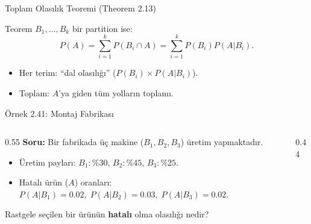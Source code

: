 \documentclass[light]{lutbeamer}
\begin{document}
\begin{frame}[fragile]{Toplam Olasılık Teoremi (Theorem 2.13)}
    \begin{block}{Teorem}
        \(B_1,\dots,B_k\) bir partition ise:
        \[
        P(A)=\sum_{i=1}^{k}P(B_i\cap A)=\sum_{i=1}^{k}P(B_i)P(A|B_i).
        \]
    \end{block}

    \begin{itemize}
        \item Her terim: ``dal olasılığı'' (\(P(B_i)\times P(A|B_i)\)).
        \item Toplam: \(A\)'ya giden tüm yolların toplamı.
    \end{itemize}
\end{frame}


\begin{frame}{Örnek 2.41: Montaj Fabrikası}
    \small
    \begin{columns}[T]
        \begin{column}{0.55\textwidth}
            \textbf{Soru:}
            Bir fabrikada üç makine ($B_1, B_2, B_3$) üretim yapmaktadır.
            \begin{itemize}
                \item Üretim payları: $B_1: \%30, \, B_2: \%45, \, B_3: \%25$.
                \item Hatalı ürün ($A$) oranları: $P(A|B_1)=0.02,\; P(A|B_2)=0.03,\; P(A|B_3)=0.02$.
            \end{itemize}
            Rastgele seçilen bir ürünün \textbf{hatalı} olma olasılığı nedir?
            
        \end{column}
        \begin{column}{0.44\textwidth}


\end{column}
\end{columns}
\end{frame}
\end{document}
